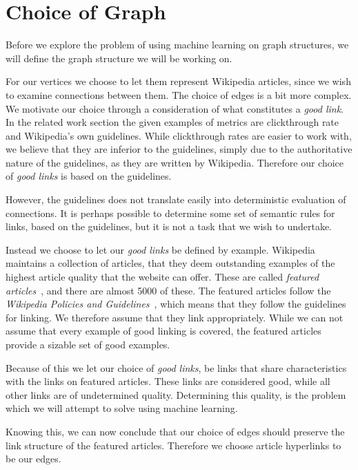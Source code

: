 \section{Choice of Graph}\label{sec:choice_of_graph}
Before we explore the problem of using machine learning on graph structures, we will define the graph structure we will be working on.

For our vertices we choose to let them represent Wikipedia articles, since we wish to examine connections between them. The choice of edges is a bit more complex. We motivate our choice through a consideration of what constitutes a \emph{good link}. In the related work section the given examples of metrics are clickthrough rate and Wikipedia's own guidelines. While clickthrough rates are easier to work with, we believe that they are inferior to the guidelines, simply due to the authoritative nature of the guidelines, as they are written by Wikipedia. Therefore our choice of \emph{good links} is based on the guidelines.

However, the guidelines does not translate easily into deterministic evaluation of connections. It is perhaps possible to determine some set of semantic rules for links, based on the guidelines, but it is not a task that we wish to undertake.

Instead we choose to let our \emph{good links} be defined by example. Wikipedia maintains a collection of articles, that they deem outstanding examples of the highest article quality that the website can offer. These are called \emph{featured articles}~\cite{wiki-featured-articles}, and there are almost 5000 of these. The featured articles follow the \emph{Wikipedia Policies and Guidelines}~\cite{wiki-editor-guidelines}, which means that they follow the guidelines for linking. We therefore assume that they link appropriately. While we can not assume that every example of good linking is covered, the featured articles provide a sizable set of good examples.

Because of this we let our choice of \emph{good links}, be links that share characteristics with the links on featured articles. These links are considered good, while all other links are of undetermined quality. Determining this quality, is the problem which we will attempt to solve using machine learning.

Knowing this, we can now conclude that our choice of edges should preserve the link structure of the featured articles. Therefore we choose article hyperlinks to be our edges.

